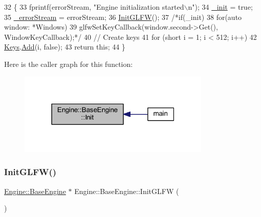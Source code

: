 \begin{DoxyCode}
32 \{
33     fprintf(errorStream, \textcolor{stringliteral}{"Engine initialization started\(\backslash\)n"});
34     \mbox{\hyperlink{classEngine_1_1BaseEngine_a79e265845b321c0e9822fb170c564e55}{\_init}} = \textcolor{keyword}{true};
35     \mbox{\hyperlink{classEngine_1_1BaseEngine_a26fd54a1ee2733f9c654af5afcfa96cf}{\_errorStream}} = errorStream;
36     \mbox{\hyperlink{classEngine_1_1BaseEngine_a3e5950c7d1825f81d7d1fc584cb8b0c1}{InitGLFW}}();
37     \textcolor{comment}{/*if(\_init)}
38 \textcolor{comment}{        for(auto window: *Windows)}
39 \textcolor{comment}{            glfwSetKeyCallback(window.second->Get(), WindowKeyCallback);*/}
40     \textcolor{comment}{// Create keys}
41     \textcolor{keywordflow}{for} (\textcolor{keywordtype}{short} i = 1; i < 512; i++)
42         \mbox{\hyperlink{classEngine_1_1BaseEngine_a65321a97e83f0a6ee90df3efac2d3307}{Keys}}.\mbox{\hyperlink{classGeneric_1_1Dictionary_ae7cb006f801b21c172e8fbac8794fa99}{Add}}(i, \textcolor{keyword}{false});
43     \textcolor{keywordflow}{return} \textcolor{keyword}{this};
44 \}
\end{DoxyCode}
Here is the caller graph for this function\+:
\nopagebreak
\begin{figure}[H]
\begin{center}
\leavevmode
\includegraphics[width=259pt]{classEngine_1_1BaseEngine_ad9c141fe48c8c91e14e77ed5fcb90196_icgraph}
\end{center}
\end{figure}
\mbox{\label{classEngine_1_1BaseEngine_a3e5950c7d1825f81d7d1fc584cb8b0c1}} 
\subsubsection{\texorpdfstring{Init\+G\+L\+F\+W()}{InitGLFW()}}
{\footnotesize\ttfamily \mbox{\hyperlink{classEngine_1_1BaseEngine}{Engine\+::\+Base\+Engine}} $\ast$ Engine\+::\+Base\+Engine\+::\+Init\+G\+L\+FW (\begin{DoxyParamCaption}{ }\end{DoxyParamCaption})\hspace{0.3cm}{\ttfamily [private]}}



